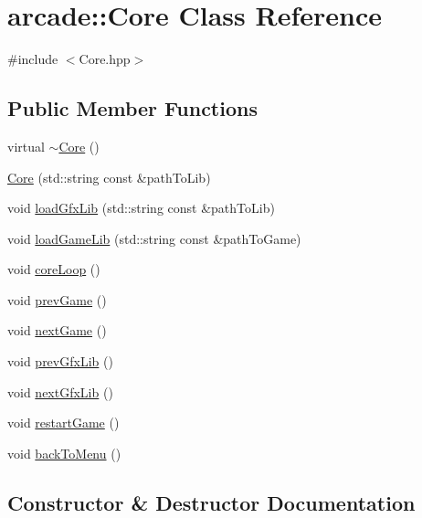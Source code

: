 \hypertarget{classarcade_1_1_core}{}\section{arcade\+:\+:Core Class Reference}
\label{classarcade_1_1_core}


{\ttfamily \#include $<$Core.\+hpp$>$}

\subsection*{Public Member Functions}
\begin{DoxyCompactItemize}
\item 
virtual \hyperlink{classarcade_1_1_core_a4a80f4851276173b3055fc41268d3b3d}{$\sim$\+Core} ()
\item 
\hyperlink{classarcade_1_1_core_a2d707a14ea555e2b72fb6fb4a6ad0305}{Core} (std\+::string const \&path\+To\+Lib)
\item 
void \hyperlink{classarcade_1_1_core_a93f9b90157e2fd1d4020542e17864280}{load\+Gfx\+Lib} (std\+::string const \&path\+To\+Lib)
\item 
void \hyperlink{classarcade_1_1_core_acbda8d28b646429b74b94e0e87ea8620}{load\+Game\+Lib} (std\+::string const \&path\+To\+Game)
\item 
void \hyperlink{classarcade_1_1_core_a1fd3e057f1a020bd61a074bb2143bac7}{core\+Loop} ()
\item 
void \hyperlink{classarcade_1_1_core_a60fbdf58db50c1ab65c3f31d02f5d3d3}{prev\+Game} ()
\item 
void \hyperlink{classarcade_1_1_core_a7147bc7c0a9f184ea2237848d2bfd570}{next\+Game} ()
\item 
void \hyperlink{classarcade_1_1_core_a080c95e72cb95b887ca959f1a07a885e}{prev\+Gfx\+Lib} ()
\item 
void \hyperlink{classarcade_1_1_core_a8e9e31b7c6313edf31fe7a44af4b01d1}{next\+Gfx\+Lib} ()
\item 
void \hyperlink{classarcade_1_1_core_a5393143a3668f07126a6f20c12f0fa9a}{restart\+Game} ()
\item 
void \hyperlink{classarcade_1_1_core_a2785108b212f43d686484d514478f238}{back\+To\+Menu} ()
\end{DoxyCompactItemize}


\subsection{Constructor \& Destructor Documentation}
\mbox{\label{classarcade_1_1_core_a4a80f4851276173b3055fc41268d3b3d}} 
